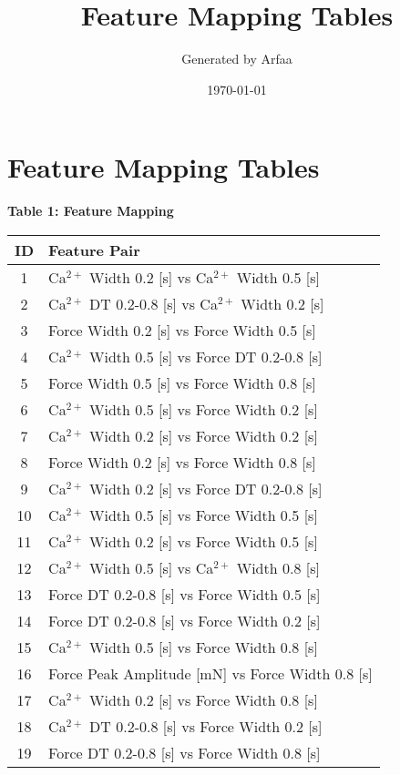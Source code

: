 \documentclass{article}
\begin{document}
\title{Feature Mapping Tables}
\author{Generated by Arfaa}
\date{\today}
\maketitle

\section*{Feature Mapping Tables}

\noindent\textbf{Table 1: Feature Mapping}
\begin{longtable}{|c|l|}
\hline
\textbf{ID} & \textbf{Feature Pair} \\
\hline
\endhead
1 & Ca$^{2+}$ Width 0.2 [s] vs Ca$^{2+}$ Width 0.5 [s] \\
\hline
2 & Ca$^{2+}$ DT 0.2-0.8 [s] vs Ca$^{2+}$ Width 0.2 [s] \\
\hline
3 & Force Width 0.2 [s] vs Force Width 0.5 [s] \\
\hline
4 & Ca$^{2+}$ Width 0.5 [s] vs Force DT 0.2-0.8 [s] \\
\hline
5 & Force Width 0.5 [s] vs Force Width 0.8 [s] \\
\hline
6 & Ca$^{2+}$ Width 0.5 [s] vs Force Width 0.2 [s] \\
\hline
7 & Ca$^{2+}$ Width 0.2 [s] vs Force Width 0.2 [s] \\
\hline
8 & Force Width 0.2 [s] vs Force Width 0.8 [s] \\
\hline
9 & Ca$^{2+}$ Width 0.2 [s] vs Force DT 0.2-0.8 [s] \\
\hline
10 & Ca$^{2+}$ Width 0.5 [s] vs Force Width 0.5 [s] \\
\hline
11 & Ca$^{2+}$ Width 0.2 [s] vs Force Width 0.5 [s] \\
\hline
12 & Ca$^{2+}$ Width 0.5 [s] vs Ca$^{2+}$ Width 0.8 [s] \\
\hline
13 & Force DT 0.2-0.8 [s] vs Force Width 0.5 [s] \\
\hline
14 & Force DT 0.2-0.8 [s] vs Force Width 0.2 [s] \\
\hline
15 & Ca$^{2+}$ Width 0.5 [s] vs Force Width 0.8 [s] \\
\hline
16 & Force Peak Amplitude [mN] vs Force Width 0.8 [s] \\
\hline
17 & Ca$^{2+}$ Width 0.2 [s] vs Force Width 0.8 [s] \\
\hline
18 & Ca$^{2+}$ DT 0.2-0.8 [s] vs Force Width 0.2 [s] \\
\hline
19 & Force DT 0.2-0.8 [s] vs Force Width 0.8 [s] \\

\end{longtable}
\end{document}
